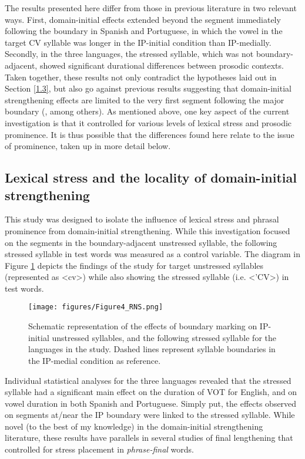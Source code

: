 \documentclass[output=paper]{langscibook}
\begin{document}
\begin{sloppypar}
The results presented here differ from those in previous literature in two relevant ways. First, domain-initial effects extended beyond the segment immediately following the boundary in Spanish and Portuguese, in which the vowel in the target CV syllable was longer in the IP-initial condition than IP-medially. Secondly, in the three languages, the stressed syllable, which was not boundary-adjacent, showed significant durational differences between prosodic contexts. Taken together, these results not only contradict the hypotheses laid out in Section \ref{1.3}, but also go against previous results suggesting that domain-initial strengthening effects are limited to the very first segment following the major boundary (\citealt{b, ck09, bmhk10}, among others). As mentioned above, one key aspect of the current investigation is that it controlled for various levels of lexical stress and prosodic prominence. It is thus possible that the differences found here relate to the issue of prominence, taken up in more detail below.
\end{sloppypar}

\subsection{Lexical stress and the locality of domain-initial strengthening}
This study was designed to isolate the influence of lexical stress and phrasal prominence from domain-initial strengthening. While this investigation focused on the segments in the boundary-adjacent unstressed syllable, the following stressed syllable in test words was measured as a control variable. The diagram in Figure \ref{fig:fig4} depicts the findings of the study for target unstressed syllables (represented as <cv>) while also showing the stressed syllable (i.e. <'CV>) in test words.



\begin{figure}
\texttt{[image: figures/Figure4\_RNS.png]}
\caption{Schematic representation of the effects of boundary marking on IP-initial unstressed syllables, and the following stressed syllable for the languages in the study. Dashed lines represent syllable boundaries in the IP-medial condition as reference.}
\label{fig:fig4}
\end{figure}


Individual statistical analyses for the three languages revealed that the stressed syllable had a significant main effect on the duration of VOT for English, and on vowel duration in both Spanish and Portuguese. Simply put, the effects observed on segments at/near the IP boundary were linked to the stressed syllable. While novel (to the best of my knowledge) in the domain-initial strengthening literature, these results have parallels in several studies of final lengthening that controlled for stress placement in \textit{phrase-final} words. 
\end{document}
